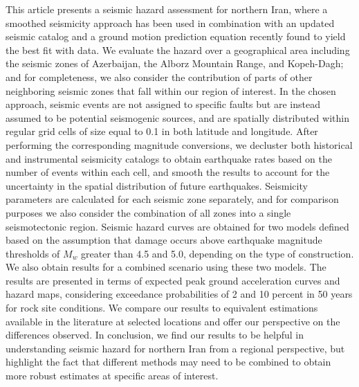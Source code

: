 % 
This article presents a seismic hazard assessment for northern Iran, where a smoothed seismicity approach has been used in combination with an updated seismic catalog and a ground motion prediction equation recently found to yield the best fit with data. We evaluate the hazard over a geographical area including the seismic zones of Azerbaijan, the Alborz Mountain Range, and Kopeh-Dagh; and for completeness, we also consider the contribution of parts of other neighboring seismic zones that fall within our region of interest. In the chosen approach, seismic events are not assigned to specific faults but are instead assumed to be potential seismogenic sources, and are spatially distributed within regular grid cells of size equal to 0.1\textdegree{} in both latitude and longitude. After performing the corresponding magnitude conversions, we decluster both historical and instrumental seismicity catalogs to obtain earthquake rates based on the number of events within each cell, and smooth the results to account for the uncertainty in the spatial distribution of future earthquakes. Seismicity parameters are calculated for each seismic zone separately, and for comparison purposes we also consider the combination of all zones into a single seismotectonic region. Seismic hazard curves are obtained for two models defined based on the assumption that damage occurs above earthquake magnitude thresholds of $M_w$ greater than 4.5 and 5.0, depending on the type of construction. We 
also obtain results for a combined scenario using these two models. The results are presented in terms of expected peak ground acceleration curves and hazard maps, considering exceedance probabilities of 2 and 10 percent in 50 years for rock site conditions. We compare our results to equivalent estimations available in the literature at selected locations and offer our perspective on the differences observed. In conclusion, we find our results to be helpful in understanding seismic hazard for northern Iran from a regional perspective, but highlight the fact that different methods may need to be combined to obtain more robust estimates at specific areas of interest.

